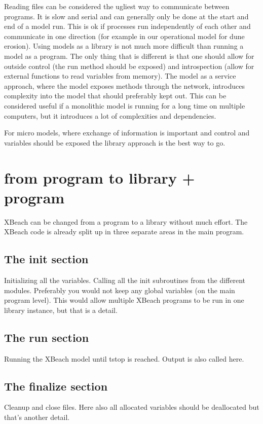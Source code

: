 \documentclass{article}
\begin{document}
Reading files can be considered the ugliest way to communicate between programs. It is slow and serial and can generally only be done at the start and end of a model run. This is ok if processes run independently of each other and communicate in one direction (for example in our operational model for dune erosion). 
Using models as a library is not much more difficult than running a model as a program. The only thing that is different is that one should allow for outside control (the run method should be exposed) and introspection (allow for external functions to read variables from memory). 
The model as a service approach, where the model exposes methods through the network, introduces complexity into the model that should preferably kept out. This can be considered useful if a monolithic model is running for a long time on multiple computers, but it introduces a lot of complexities and dependencies. %

For micro models, where exchange of information is important and control and variables should be exposed the library approach is the best way to go. 

\section{from program to library + program}
XBeach can be changed from a program to a library without much effort. The XBeach code is already split up in three separate areas in the main program.

\subsection{The init section}
Initializing all the variables. Calling all the init subroutines from the different modules. 
Preferably you would not keep any global variables (on the main program level). This would allow multiple XBeach programs to be run in one library instance, but that is a detail. 
 
\subsection{The run section}
Running the XBeach model until tstop is reached. Output is also called here. 
 
\subsection{The finalize section}
Cleanup  and close files. Here also all allocated variables should be deallocated but that's another detail.  
 
\end{document}
